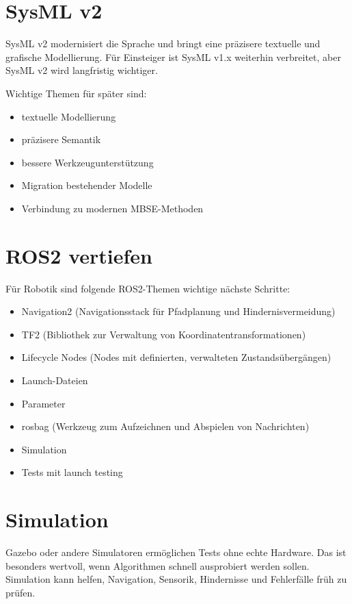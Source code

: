 \section{SysML v2}
SysML v2 modernisiert die Sprache und bringt eine präzisere textuelle und grafische Modellierung. Für Einsteiger ist SysML v1.x weiterhin verbreitet, aber SysML v2 wird langfristig wichtiger.

Wichtige Themen für später sind:

\begin{itemize}
    \item textuelle Modellierung
    \item präzisere Semantik
    \item bessere Werkzeugunterstützung
    \item Migration bestehender Modelle
    \item Verbindung zu modernen MBSE-Methoden
\end{itemize}

\section{ROS2 vertiefen}
Für Robotik sind folgende ROS2-Themen wichtige nächste Schritte:

\begin{itemize}
    \item Navigation2 (Navigationsstack für Pfadplanung und Hindernisvermeidung)
    \item TF2 (Bibliothek zur Verwaltung von Koordinatentransformationen)
    \item Lifecycle Nodes (Nodes mit definierten, verwalteten Zustandsübergängen)
    \item Launch-Dateien
    \item Parameter
    \item rosbag (Werkzeug zum Aufzeichnen und Abspielen von Nachrichten)
    \item Simulation
    \item Tests mit launch testing
\end{itemize}

\section{Simulation}
Gazebo oder andere Simulatoren ermöglichen Tests ohne echte Hardware. Das ist besonders wertvoll, wenn Algorithmen schnell ausprobiert werden sollen. Simulation kann helfen, Navigation, Sensorik, Hindernisse und Fehlerfälle früh zu prüfen.

